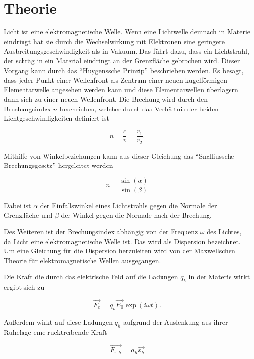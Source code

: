 \section{Theorie}

Licht ist eine elektromagnetische Welle. Wenn eine Lichtwelle demnach in Materie
eindringt hat sie durch die Wechselwirkung mit Elektronen eine geringere
Ausbreitungsgeschwindigkeit als in Vakuum. Das führt dazu, dass ein Lichtstrahl,
der schräg in ein Material eindringt an der Grenzfläche gebrochen wird.
Dieser Vorgang kann durch das \enquote{Huygenssche Prinzip} beschrieben werden.
Es besagt, dass jeder Punkt einer Wellenfront als Zentrum einer neuen kugelförmigen
Elementarwelle angesehen werden kann und diese Elementarwellen überlagern dann sich zu einer
neuen Wellenfront.
Die Brechung wird durch den Brechungsindex $n$ beschrieben, welcher durch das
Verhältnis der beiden Lichtgeschwindigkeiten definiert ist

\begin{equation}
  n = \frac{c}{v} = \frac{v_1}{v_2}.
  \label{eq:1}
\end{equation}

Mithilfe von Winkelbeziehungen kann aus dieser Gleichung das
\enquote{Snelliussche Brechungsgesetz} hergeleitet werden

\begin{equation}
  n = \frac{\sin(\alpha)}{\sin(\beta)}
  \label{eq:2}
\end{equation}

Dabei ist $\alpha$ der Einfallswinkel eines Lichtstrahls gegen die Normale
der Grenzfläche und $\beta$ der Winkel gegen die Normale nach der Brechung.

Des Weiteren ist der Brechungsindex abhängig von der Frequenz $\omega$ des Lichtes,
da Licht eine elektromagnetische Welle ist. Das wird als Dispersion bezeichnet. Um
eine Gleichung für die Dispersion herzuleiten wird von der Maxwellschen Theorie
für elektromagnetische Wellen ausgegangen.

Die Kraft die durch das elektrische Feld auf die Ladungen $q_h$ in der Materie wirkt ergibt
sich zu

\begin{equation*}
  \vec{F_e} = q_h \vec{E_0} \exp(i \omega t).
\end{equation*}

Außerdem wirkt auf diese Ladungen $q_h$ aufgrund der Auslenkung aus ihrer Ruhelage
eine rücktreibende Kraft

\begin{equation*}
  \vec{F_{r,h}} = a_h \vec{x_h}
\end{equation*}

